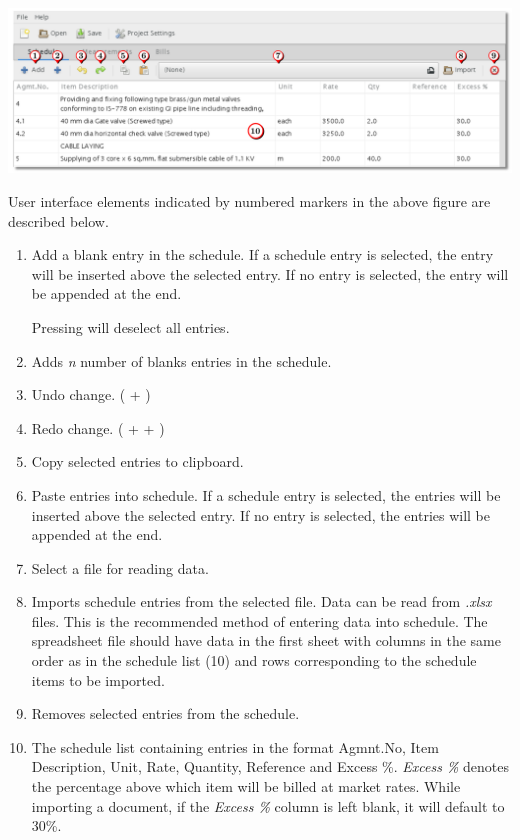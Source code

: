 \documentclass[twoside,a4paper]{refart}
\newenvironment{noteblock}[1]%
{\begin{mdframed}[topline=false,bottomline=false, rightline=false,
		linewidth=2pt, frametitle={#1}]}%
		{\end{mdframed}}
\begin{document}
	 \begin{maxipage}
	 	\includegraphics[width=1\linewidth]{screenshots/window_sch.png}
	 \end{maxipage}
	 
	 User interface elements indicated by numbered markers in the above figure are described below.
	 
	 \begin{enumerate}
	 	\item Add a blank entry in the schedule. If a schedule entry is selected, the entry will be inserted above the selected entry. If no entry is selected, the entry will be appended at the end.\\
	 	\begin{noteblock}{Tips!}
	 		Pressing  will deselect all entries.
	 	\end{noteblock}
	 	\item Adds \emph{n} number of blanks entries in the schedule.
	 	\item Undo change. ( + )
	 	\item Redo change. ( +  + )	 
	 	\item Copy selected entries to clipboard.
	 	\item Paste entries into schedule. If a schedule entry is selected, the entries will be inserted above the selected entry. If no entry is selected, the entries will be appended at the end.
	 	\item Select a file for reading data.
	 	\item \attention Imports schedule entries from the selected file. Data can be read from \emph{.xlsx} files. This is the recommended method of entering data into schedule. The spreadsheet file should have data in the first sheet with columns in the same order as in the schedule list (10) and rows corresponding to the schedule items to be imported.
	 	\item Removes selected entries from the schedule.
	 	\item The schedule list containing entries in the format Agmnt.No, Item Description, Unit, Rate, Quantity, Reference and Excess \%. \emph{Excess \%} denotes the percentage above which item will be billed at market rates. \attention While importing a document, if the \emph{Excess \%} column is left blank, it will default to 30\%.
	 \end{enumerate}
	 
\end{document}
